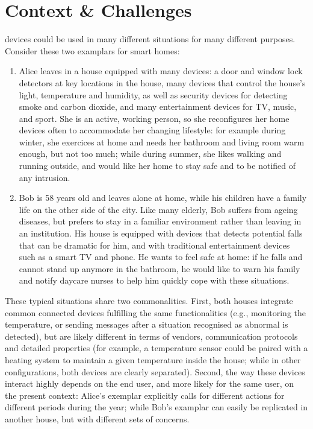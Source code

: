 \section{Context \& Challenges}
\label{sec:Context-Challenges}

\IOT devices could be used in many different situations for many different purposes. Consider these two examplars for smart homes:
\begin{enumerate}
	\item Alice leaves in a house equipped with many devices: a door and window lock detectors at key locations in the house, many devices that control the house's light, temperature and humidity, as well as security devices for detecting smoke and carbon dioxide, and many entertainment devices for TV, music, and sport. She is an active, working person, so she reconfigures her home devices often to accommodate her changing lifestyle: for example during winter, she exercices at home and needs her bathroom and living room warm enough, but not too much; while during summer, she likes walking and running outside, and would like her home to stay safe and to be notified of any intrusion. 
	
	\item Bob is 58 years old and leaves alone at home, while his children have a family life on the other side of the city. Like many elderly, Bob suffers from ageing diseases, but prefers to stay in a familiar environment rather than leaving in an institution. His house is equipped with devices that detects potential falls that can be dramatic for him, and with traditional entertainment devices such as a smart TV and phone. He wants to feel safe at home: if he falls and cannot stand up anymore in the bathroom, he would like to warn his family and notify daycare nurses to help him quickly cope with these situations. 
\end{enumerate}
These typical situations share two commonalities. First, both houses integrate common connected devices fulfilling the same functionalities (e.g., monitoring the temperature, or sending messages after a situation recognised as abnormal is detected), but are likely different in terms of vendors, communication protocols and detailed properties (for example, a temperature sensor could be paired with a heating system to maintain a given temperature inside the house; while in other configurations, both devices are clearly separated). Second, the way these devices interact highly depends on the end user, and more likely for the same user, on the present context: Alice's exemplar explicitly calls for different actions for different periods during the year; while Bob's examplar can easily be replicated in another house, but with different sets of concerns. 

